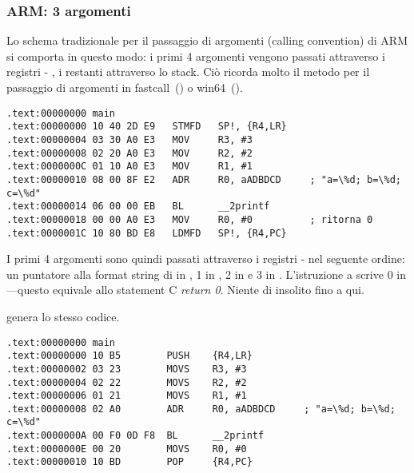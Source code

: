 \subsubsection{ARM: 3 argomenti}

Lo schema tradizionale per il passaggio di argomenti (calling convention) di ARM si comporta in questo modo:
i primi 4 argomenti vengono passati attraverso i registri - , i restanti attraverso lo stack.
Ciò ricorda molto il metodo per il passaggio di argomenti in 
fastcall~() o win64~().


\mysubparagraph{\NonOptimizingKeilVI (\ARMMode)}

\begin{lstlisting}[caption=\NonOptimizingKeilVI (\ARMMode),style=customasmARM]
.text:00000000 main
.text:00000000 10 40 2D E9   STMFD   SP!, {R4,LR}
.text:00000004 03 30 A0 E3   MOV     R3, #3
.text:00000008 02 20 A0 E3   MOV     R2, #2
.text:0000000C 01 10 A0 E3   MOV     R1, #1
.text:00000010 08 00 8F E2   ADR     R0, aADBDCD     ; "a=\%d; b=\%d; c=\%d"
.text:00000014 06 00 00 EB   BL      __2printf
.text:00000018 00 00 A0 E3   MOV     R0, #0          ; ritorna 0
.text:0000001C 10 80 BD E8   LDMFD   SP!, {R4,PC}
\end{lstlisting}

I primi 4 argomenti sono quindi passati attraverso i registri - nel seguente ordine:
un puntatore alla format string di \printf in 
, 1 in , 2 in  e 3 in .
L'istruzione a  scrive 0 in ---questo equivale allo statement C \emph{return 0}.
Niente di insolito fino a qui.

\OptimizingKeilVI genera lo stesso codice.

\mysubparagraph{\OptimizingKeilVI (\ThumbMode)}

\begin{lstlisting}[caption=\OptimizingKeilVI (\ThumbMode),style=customasmARM]
.text:00000000 main
.text:00000000 10 B5        PUSH    {R4,LR}
.text:00000002 03 23        MOVS    R3, #3
.text:00000004 02 22        MOVS    R2, #2
.text:00000006 01 21        MOVS    R1, #1
.text:00000008 02 A0        ADR     R0, aADBDCD     ; "a=\%d; b=\%d; c=\%d"
.text:0000000A 00 F0 0D F8  BL      __2printf
.text:0000000E 00 20        MOVS    R0, #0
.text:00000010 10 BD        POP     {R4,PC}
\end{lstlisting}

